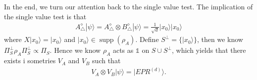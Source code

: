 \documentclass[11pt,letterpaper]{article}
\newcommand{\ket}[1]{|#1\rangle}
\newcommand{\ketbra}[2]{|#1\rangle\langle#2|}
\newcommand{\x}{\otimes}
\DeclareMathOperator{\Tr}{Tr}
\DeclareMathOperator{\supp}{supp}
\newcommand{\1}{\mathbb{1}}
\newcommand{\CHSH}{CHSH^{(d)}}
\newcommand{\SVT}{SVT}
\newcommand{\EPR}[1]{EPR^{(#1)}}
\newcommand{\tA}{\tilde{A}}
\theoremstyle{definition}
\begin{document}
In the end, we turn our attention back to the single value test. 
The implication of the single value test is that
\begin{align}
	A_\triangle^\diamond \ket{\psi} = A_\triangle^\diamond \x B_\triangle^\diamond \ket{\psi} = \frac{1}{\sqrt{d}}
	\ket{x_0}\ket{x_0}
\end{align}
where $X \ket{x_0} = \ket{x_0}$ and $\ket{x_0} \in \supp(\rho_A)$. 
Define $S^\perp = \{ \ket{x_0}\}$, then we know $\Pi_S^\perp \rho_A \Pi_S^\perp \propto \Pi_S$.
Hence we know $\rho_A$ acts as $\1$ on $S \cup S^\perp$, which yields that there exists i
sometries $V_A$ and $V_B$ such that
\begin{align}
	V_A \x V_B \ket{\psi} = \ket{\EPR{d}}.
\end{align}
 






\appendix
\end{document}
